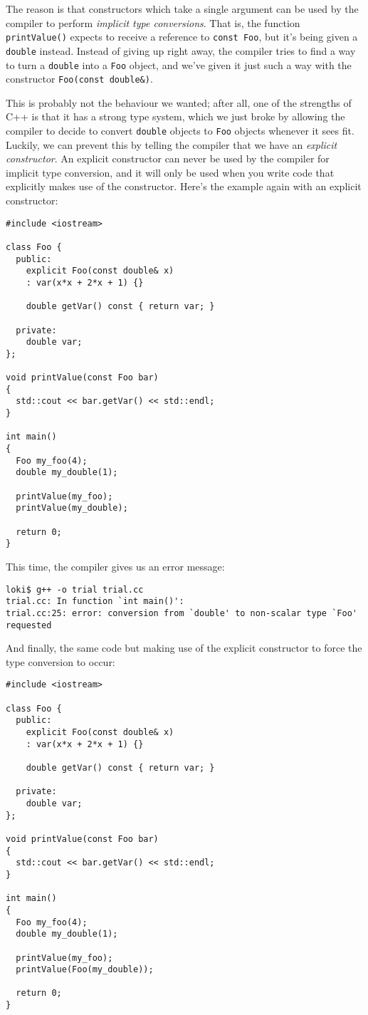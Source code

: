\documentclass[a4paper]{scrartcl}
\begin{document}
The reason is that constructors which take a single argument can be used by the compiler to perform \emph{implicit type conversions}. That is, the function \texttt{printValue()} expects to receive a reference to \texttt{const Foo}, but it's being given a \texttt{double} instead. Instead of giving up right away, the compiler tries to find a way to turn a \texttt{double} into a \texttt{Foo} object, and we've given it just such a way with the constructor \texttt{Foo(const double\&)}.

This is probably not the behaviour we wanted; after all, one of the strengths of C++ is that it has a strong type system, which we just broke by allowing the compiler to decide to convert \texttt{double} objects to \texttt{Foo} objects whenever it sees fit. Luckily, we can prevent this by telling the compiler that we have an \emph{explicit constructor}. An explicit constructor can never be used by the compiler for implicit type conversion, and it will only be used when you write code that explicitly makes use of the constructor. Here's the example again with an explicit constructor:
\begin{verbatim}
#include <iostream>

class Foo {
  public:
    explicit Foo(const double& x)
    : var(x*x + 2*x + 1) {}
	
    double getVar() const { return var; }

  private:
    double var;
};

void printValue(const Foo bar)
{
  std::cout << bar.getVar() << std::endl;
}

int main()
{
  Foo my_foo(4);
  double my_double(1);

  printValue(my_foo);
  printValue(my_double);

  return 0;
}
\end{verbatim}

This time, the compiler gives us an error message:
\begin{verbatim}
loki$ g++ -o trial trial.cc
trial.cc: In function `int main()':
trial.cc:25: error: conversion from `double' to non-scalar type `Foo' requested
\end{verbatim}

And finally, the same code but making use of the explicit constructor to force the type conversion to occur:
\begin{verbatim}
#include <iostream>

class Foo {
  public:
    explicit Foo(const double& x)
    : var(x*x + 2*x + 1) {}
	
    double getVar() const { return var; }

  private:
    double var;
};

void printValue(const Foo bar)
{
  std::cout << bar.getVar() << std::endl;
}

int main()
{
  Foo my_foo(4);
  double my_double(1);

  printValue(my_foo);
  printValue(Foo(my_double));

  return 0;
}
\end{verbatim}
\end{document}
